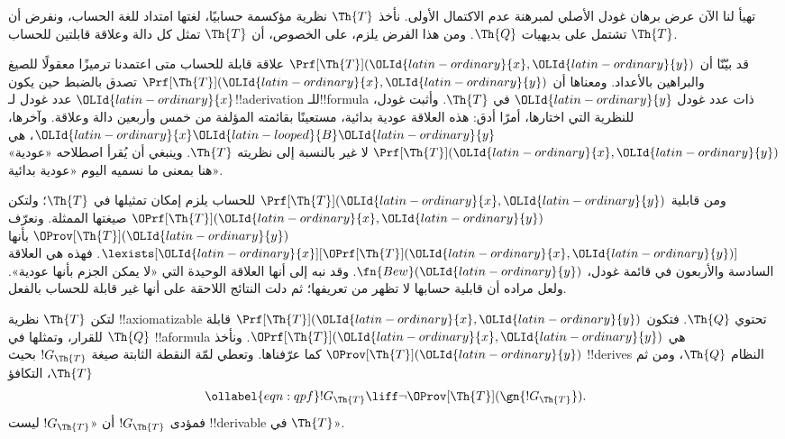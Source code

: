 \documentclass[../../../include/open-logic-section]{subfiles}
\begin{document}


تهيأ لنا الآن عرض برهان غودل الأصلي لمبرهنة عدم الاكتمال الأولى.
نأخذ $\Th{T}$ نظرية مؤكسمة حسابيًا، لغتها امتداد للغة الحساب،
ونفرض أن $\Th{T}$ تشتمل على بديهيات $\Th{Q}$. ومن هذا الفرض
يلزم، على الخصوص، أن $\Th{T}$ تمثل كل دالة وعلاقة قابلتين للحساب.

قد بيّنّا أن $\Prf[\Th{T}]({\OLId{latin-ordinary}{x}},{\OLId{latin-ordinary}{y}})$ علاقة قابلة للحساب متى اعتمدنا
ترميزًا معقولًا للصيغ والبراهين بالأعداد. ومعناها أن
$\Prf[\Th{T}]({\OLId{latin-ordinary}{x}},{\OLId{latin-ordinary}{y}})$ تصدق بالضبط حين يكون ${\OLId{latin-ordinary}{x}}$ عدد غودل
لـ!!a{derivation} للـ!!{formula} ذات عدد غودل ${\OLId{latin-ordinary}{y}}$ في
$\Th{T}$. وأثبت غودل، للنظرية التي اختارها، أمرًا أدق: هذه العلاقة
عودية بدائية، مستعينًا بقائمته المؤلفة من خمس وأربعين دالة وعلاقة.
وآخرها، ${\OLId{latin-ordinary}{x}} {\OLId{latin-looped}{B}} {\OLId{latin-ordinary}{y}}$، هي $\Prf[\Th{T}]({\OLId{latin-ordinary}{x}},{\OLId{latin-ordinary}{y}})$ لا غير بالنسبة إلى
نظريته $\Th{T}$. وينبغي أن يُقرأ اصطلاحه «عودية» هنا بمعنى ما
نسميه اليوم «عودية بدائية».

ومن قابلية $\Prf[\Th{T}]({\OLId{latin-ordinary}{x}},{\OLId{latin-ordinary}{y}})$ للحساب يلزم إمكان تمثيلها في
$\Th{T}$؛ ولتكن $\OPrf[\Th{T}]({\OLId{latin-ordinary}{x}},{\OLId{latin-ordinary}{y}})$ صيغتها الممثلة.
ونعرّف $\OProv[\Th{T}]({\OLId{latin-ordinary}{y}})$ بأنها
$\lexists[{\OLId{latin-ordinary}{x}}][\OPrf[\Th{T}]({\OLId{latin-ordinary}{x}},{\OLId{latin-ordinary}{y}})]$. فهذه هي العلاقة السادسة
والأربعون في قائمة غودل، $\fn{Bew}({\OLId{latin-ordinary}{y}})$. وقد نبه إلى أنها العلاقة
الوحيدة التي «لا يمكن الجزم بأنها عودية». ولعل مراده أن قابلية
حسابها لا تظهر من تعريفها؛ ثم دلت النتائج اللاحقة على أنها
غير قابلة للحساب بالفعل.

لتكن $\Th{T}$ نظرية !!{axiomatizable} تحتوي $\Th{Q}$.
فتكون $\Prf[\Th{T}]({\OLId{latin-ordinary}{x}},{\OLId{latin-ordinary}{y}})$ قابلة للقرار، وتمثلها في $\Th{Q}$
!!a{formula} هي $\OPrf[\Th{T}]({\OLId{latin-ordinary}{x}},{\OLId{latin-ordinary}{y}})$. ونأخذ
$\OProv[\Th{T}]({\OLId{latin-ordinary}{y}})$ كما عرّفناها. وتعطي لمّة النقطة الثابتة صيغة
$!G_\Th{T}$ بحيث !!{derive}s النظام $\Th{Q}$، ومن ثم $\Th{T}$،
التكافؤ
\begin{equation}
\ollabel{eqn:qpf}
!G_\Th{T} \liff \lnot \OProv[\Th{T}](\gn{!G_\Th{T}}).
\end{equation}
فمؤدى $!G_\Th{T}$ أن «$!G_\Th{T}$ ليست !!{derivable} في
$\Th{T}$».
\end{document}

